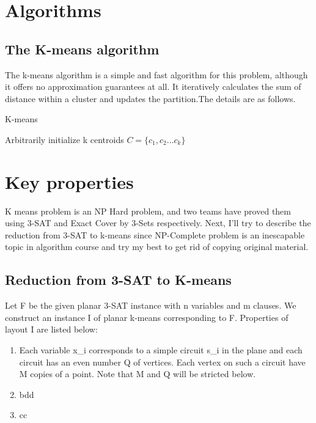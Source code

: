 \documentclass[11pt]{article}
\begin{document}
\section{Algorithms}
\subsection{The K-means algorithm}
The k-means algorithm is a simple and fast algorithm for this problem, although it offers no approximation guarantees at all.
It iteratively calculates the sum of distance within a cluster and updates the partition.The details are as follows.\cite{k-means}
\begin{algorithm}
  \caption{K-means}
  \label{k-means}
  \begin{algorithmic}
    \STATE Arbitrarily initialize k centroids $C=\{c_1, c_2 \dots c_k\}$ 
    \REPEAT
      \ENDFOR
      \ENDFOR
      \ENDFOR
      \ENDFOR
  \end{algorithmic}
\end{algorithm}

\section{Key properties}
K means problem is an NP Hard problem, and two teams have proved them using 3-SAT and Exact Cover by 3-Sets respectively.\cite{npc-prove,Vattani_thehardness} Next, I'll try to describe the reduction from 3-SAT to k-means since NP-Complete problem is an inescapable topic in algorithm course and try my best to get rid of copying original material.
\subsection{Reduction from 3-SAT to K-means}
Let {F} be the given planar 3-SAT instance with n variables and m clauses. We construct an instance I of planar k-means corresponding to F. Properties of layout I are listed below:
\begin{enumerate}
\item Each variable x_i corresponds to a simple circuit s_i in the plane and each circuit has an even number Q of vertices. Each vertex on such a circuit have M copies of a point. Note that M and Q will be stricted below.
\item bdd
\item cc
\end{enumerate}
\end{document}
